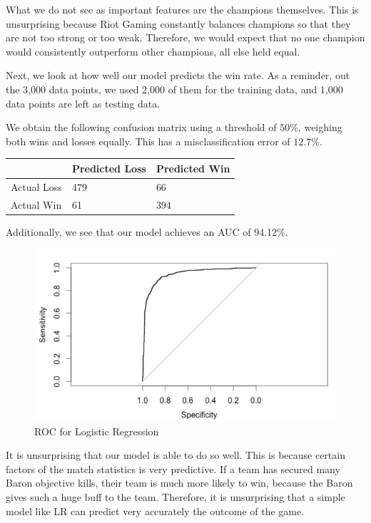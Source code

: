 \documentclass[runningheads]{llncs}
\begin{document}
	What we do not see as important features are the champions themselves. This is unsurprising because Riot Gaming constantly balances champions so that they are not too strong or too weak. Therefore, we would expect that no one champion would consistently outperform other champions, all else held equal.

	Next, we look at how well our model predicts the win rate. As a reminder, out the 3,000 data points, we used 2,000 of them for the training data, and 1,000 data points are left as testing data.

	We obtain the following confusion matrix using a threshold of $50\%$, weighing both wins and losses equally. This has a misclassification error of $12.7\%$.


	\begin{center}
		\begin{tabular}{ | L{3cm} | C{2cm} | C{2cm} | }
			\hline
			& Predicted Loss & Predicted Win \\ \hline
			Actual Loss & 479 & 66 \\ \hline
			Actual Win & 61 & 394 \\ \hline
		\end{tabular}
	\end{center}
	
	Additionally, we see that our model achieves an AUC of 94.12\%.
	
	\begin{figure}[!htb]
		\centering
		\includegraphics[width=\textwidth]{images/lr_roc.png}
		\caption{ROC for Logistic Regression}
	\end{figure}
	
	It is unsurprising that our model is able to do so well. This is because certain factors of the match statistics is very predictive. If a team has secured many Baron objective kills, their team is much more likely to win, because the Baron gives such a huge buff to the team. Therefore, it is unsurprising that a simple model like LR can predict very accurately the outcome of the game. 
\end{document}
